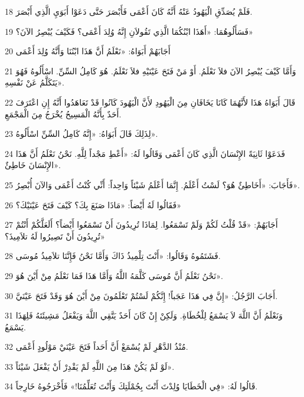 \par 18 فَلَمْ يُصَدِّقِ الْيَهُودُ عَنْهُ أَنَّهُ كَانَ أَعْمَى فَأَبْصَرَ حَتَّى دَعَوْا أَبَوَيِ الَّذِي أَبْصَرَ.
\par 19 فَسَأَلُوهُمَا: «أَهَذَا ابْنُكُمَا الَّذِي تَقُولاَنِ إِنَّهُ وُلِدَ أَعْمَى؟ فَكَيْفَ يُبْصِرُ الآنَ؟»
\par 20 أَجَابَهُمْ أَبَوَاهُ: «نَعْلَمُ أَنَّ هَذَا ابْنُنَا وَأَنَّهُ وُلِدَ أَعْمَى
\par 21 وَأَمَّا كَيْفَ يُبْصِرُ الآنَ فلاَ نَعْلَمُ. أَوْ مَنْ فَتَحَ عَيْنَيْهِ فلاَ نَعْلَمُ. هُوَ كَامِلُ السِّنِّ. اسْأَلُوهُ فَهُوَ يَتَكَلَّمُ عَنْ نَفْسِهِ».
\par 22 قَالَ أَبَوَاهُ هَذَا لأَنَّهُمَا كَانَا يَخَافَانِ مِنَ الْيَهُودِ لأَنَّ الْيَهُودَ كَانُوا قَدْ تَعَاهَدُوا أَنَّهُ إِنِ اعْتَرَفَ أَحَدٌ بِأَنَّهُ الْمَسِيحُ يُخْرَجُ مِنَ الْمَجْمَعِ.
\par 23 لِذَلِكَ قَالَ أَبَوَاهُ: «إِنَّهُ كَامِلُ السِّنِّ اسْأَلُوهُ».
\par 24 فَدَعَوْا ثَانِيَةً الإِنْسَانَ الَّذِي كَانَ أَعْمَى وَقَالُوا لَهُ: «أَعْطِ مَجْداً لِلَّهِ. نَحْنُ نَعْلَمُ أَنَّ هَذَا الإِنْسَانَ خَاطِئٌ».
\par 25 فَأَجَابَ: «أَخَاطِئٌ هُوَ؟ لَسْتُ أَعْلَمُ. إِنَّمَا أَعْلَمُ شَيْئاً وَاحِداً: أَنِّي كُنْتُ أَعْمَى وَالآنَ أُبْصِرُ».
\par 26 فَقَالُوا لَهُ أَيْضاً: «مَاذَا صَنَعَ بِكَ؟ كَيْفَ فَتَحَ عَيْنَيْكَ؟»
\par 27 أَجَابَهُمْ: «قَدْ قُلْتُ لَكُمْ وَلَمْ تَسْمَعُوا. لِمَاذَا تُرِيدُونَ أَنْ تَسْمَعُوا أَيْضاً؟ أَلَعَلَّكُمْ أَنْتُمْ تُرِيدُونَ أَنْ تَصِيرُوا لَهُ تلاَمِيذَ؟»
\par 28 فَشَتَمُوهُ وَقَالُوا: «أَنْتَ تِلْمِيذُ ذَاكَ وَأَمَّا نَحْنُ فَإِنَّنَا تلاَمِيذُ مُوسَى.
\par 29 نَحْنُ نَعْلَمُ أَنَّ مُوسَى كَلَّمَهُ اللَّهُ وَأَمَّا هَذَا فَمَا نَعْلَمُ مِنْ أَيْنَ هُوَ».
\par 30 أَجَابَ الرَّجُلُ: «إِنَّ فِي هَذَا عَجَباً! إِنَّكُمْ لَسْتُمْ تَعْلَمُونَ مِنْ أَيْنَ هُوَ وَقَدْ فَتَحَ عَيْنَيَّ.
\par 31 وَنَعْلَمُ أَنَّ اللَّهَ لاَ يَسْمَعُ لِلْخُطَاةِ. وَلَكِنْ إِنْ كَانَ أَحَدٌ يَتَّقِي اللَّهَ وَيَفْعَلُ مَشِيئَتَهُ فَلِهَذَا يَسْمَعُ.
\par 32 مُنْذُ الدَّهْرِ لَمْ يُسْمَعْ أَنَّ أَحَداً فَتَحَ عَيْنَيْ مَوْلُودٍ أَعْمَى.
\par 33 لَوْ لَمْ يَكُنْ هَذَا مِنَ اللَّهِ لَمْ يَقْدِرْ أَنْ يَفْعَلَ شَيْئاً».
\par 34 قَالُوا لَهُ: «فِي الْخَطَايَا وُلِدْتَ أَنْتَ بِجُمْلَتِكَ وَأَنْتَ تُعَلِّمُنَا!» فَأَخْرَجُوهُ خَارِجاً.

